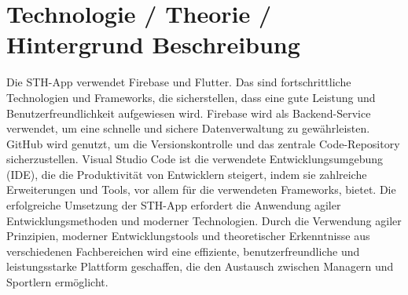 \section{Technologie / Theorie / Hintergrund Beschreibung}
Die STH-App verwendet Firebase und Flutter. Das sind fortschrittliche Technologien und Frameworks, die sicherstellen, dass eine gute Leistung und Benutzerfreundlichkeit aufgewiesen wird. Firebase wird als Backend-Service verwendet, um eine schnelle und sichere Datenverwaltung zu gewährleisten.
GitHub wird genutzt, um die Versionskontrolle und das zentrale Code-Repository sicherzustellen. Visual Studio Code ist die verwendete Entwicklungsumgebung (IDE), die die Produktivität von Entwicklern steigert, indem sie zahlreiche Erweiterungen und Tools, vor allem für die verwendeten Frameworks, bietet.
Die erfolgreiche Umsetzung der STH-App erfordert die Anwendung agiler Entwicklungsmethoden und moderner Technologien. Durch die Verwendung agiler Prinzipien, moderner Entwicklungstools und theoretischer Erkenntnisse aus verschiedenen Fachbereichen wird eine effiziente, benutzerfreundliche und leistungsstarke Plattform geschaffen, die den Austausch zwischen Managern und Sportlern ermöglicht.